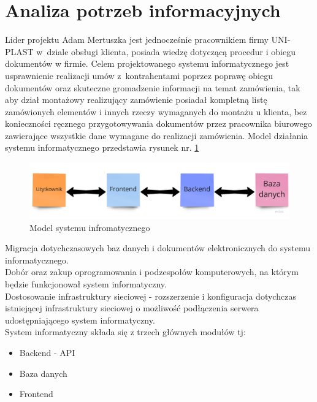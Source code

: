 \documentclass[12pt,a4paper]{article}
\begin{document}
	\section{Analiza potrzeb informacyjnych}
		\indent Lider projektu Adam Mertuszka jest jednocześnie pracownikiem firmy UNI-PLAST w~dziale obsługi klienta, posiada wiedzę dotyczącą procedur
			i obiegu dokumentów w firmie. Celem projektowanego systemu
			informatycznego jest usprawnienie realizacji umów z~kontrahentami poprzez poprawę obiegu dokumentów oraz skuteczne gromadzenie informacji na temat zamówienia, tak aby dział
			montażowy realizujący zamówienie posiadał kompletną listę zamówionych elementów i innych rzeczy wymaganych do montażu u klienta, bez konieczności
			ręcznego przygotowywania dokumentów przez pracownika biurowego zawierające wszystkie dane wymagane do realizacji zamówienia. Model działania systemu informatycznego
			przedstawia rysunek nr. \ref{fig:sys_model}\\
			\begin{figure}[H]
			\centering
			\includegraphics[width=\textwidth]{img/model_systemu_informatycznego.jpg}
			\caption{Model systemu infromatycznego}
			\label{fig:sys_model}
		\end{figure}
		\indent Migracja dotychczasowych baz danych i dokumentów elektronicznych do systemu informatycznego.\\ 
		\indent Dobór oraz zakup oprogramowania i podzespołów komputerowych, na którym będzie funkcjonował system informatyczny. \\ 
		\indent Dostosowanie infrastruktury sieciowej - rozszerzenie i konfiguracja dotychczas istniejącej infrastruktury sieciowej o możliwość podłączenia serwera udostępniającego
			system informatyczny.\\		
		\indent System informatyczny składa się z trzech głównych modułów tj:
			\begin{itemize}
				\item Backend - API
				\item Baza danych
				\item Frontend
			\end{itemize}
\end{document}
